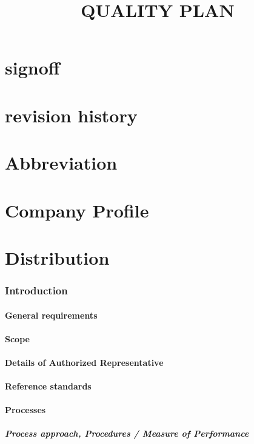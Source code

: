 \documentclass{article}
\title{ QUALITY PLAN}
\begin{document}
\maketitle
\part{signoff}

\thispagestyle{empty}
\pagebreak
\part{revision history}
\pagebreak

\tableofcontents
\part{Abbreviation}
\part{Company Profile}
\part{Distribution}
\section{Introduction}
\subsection{General requirements}
\subsection{Scope}
\subsection{Details of Authorized Representative}
\subsection{Reference standards}
\subsection{Processes}
\subsubsection{Process approach, Procedures / Measure of Performance}
\end{document}

